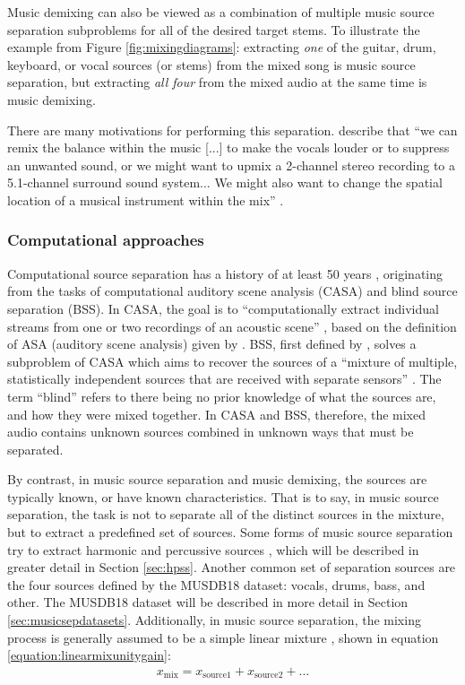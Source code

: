 \documentclass[report.tex]{subfiles}
\begin{document}
Music demixing can also be viewed as a combination of multiple music source separation subproblems for all of the desired target stems. To illustrate the example from Figure \ref{fig:mixingdiagrams}: extracting \textit{one} of the guitar, drum, keyboard, or vocal sources (or stems) from the mixed song is music source separation, but extracting \textit{all four} from the mixed audio at the same time is music demixing.

There are many motivations for performing this separation. \citeauthor{musicsepgood} describe that ``we can remix the balance within the music [...] to make the vocals louder or to suppress an unwanted sound, or we might want to upmix a 2-channel stereo recording to a 5.1-channel surround sound system... We might also want to change the spatial location of a musical instrument within the mix'' \parencite[31]{musicsepgood}.

\subsubsection{Computational approaches}
\label{sec:musicsepbackground}

Computational source separation has a history of at least 50 years \parencite{musicmask, musicsepintro1}, originating from the tasks of computational auditory scene analysis (CASA) and blind source separation (BSS). In CASA, the goal is to ``computationally extract individual streams from one or two recordings of an acoustic scene'' \parencite[12]{casabook}, based on the definition of ASA (auditory scene analysis) given by \textcite{bregman}. BSS, first defined by \textcite{jutten}, solves a subproblem of CASA which aims to recover the sources of a ``mixture of multiple, statistically independent sources that are received with separate sensors'' \parencite[190]{casabook}. The term ``blind'' refers to there being no prior knowledge of what the sources are, and how they were mixed together. In CASA and BSS, therefore, the mixed audio contains unknown sources combined in unknown ways that must be separated.

By contrast, in music source separation and music demixing, the sources are typically known, or have known characteristics. That is to say, in music source separation, the task is not to separate all of the distinct sources in the mixture, but to extract a predefined set of sources. Some forms of music source separation try to extract harmonic and percussive sources \parencite{fitzgerald1, fitzgerald2, driedger}, which will be described in greater detail in Section \ref{sec:hpss}. Another common set of separation sources are the four sources defined by the MUSDB18 \parencite{musdb18} dataset: vocals, drums, bass, and other. The MUSDB18 dataset will be described in more detail in Section \ref{sec:musicsepdatasets}. Additionally, in music source separation, the mixing process is generally assumed to be a simple linear mixture \parencite{musicsepgood}, shown in equation \eqref{equation:linearmixunitygain}:
\begin{align}
	x_{\text{mix}} = x_{\text{source1}} + x_{\text{source2}} + ... \tag{20}\label{equation:linearmixunitygain}
\end{align}
\end{document}
